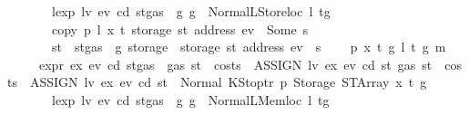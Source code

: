 \begin{isabellebody}
\ \ \ \ \ \ \ {\isachardoublequoteopen}lexp\ lv\ ev\ cd\ {\isacharparenleft}{\kern0pt}st{\isasymlparr}gas\ {\isacharcolon}{\kern0pt}{\isacharequal}{\kern0pt}\ g{\isasymrparr}{\isacharparenright}{\kern0pt}\ g\ {\isacharequal}{\kern0pt}\ Normal{\isacharparenleft}{\kern0pt}{\isacharparenleft}{\kern0pt}LStoreloc\ l{\isacharcomma}{\kern0pt}\ t{\isacharprime}{\kern0pt}{\isacharparenright}{\kern0pt}{\isacharcomma}{\kern0pt}g{\isacharprime}{\kern0pt}{\isacharparenright}{\kern0pt}{\isachardoublequoteclose}\isanewline
\ \ \ \ \ \ \ {\isachardoublequoteopen}copy\ p\ l\ x\ t\ {\isacharparenleft}{\kern0pt}storage\ st\ {\isacharparenleft}{\kern0pt}address\ ev{\isacharparenright}{\kern0pt}{\isacharparenright}{\kern0pt}\ {\isacharequal}{\kern0pt}\ Some\ s{\isachardoublequoteclose}\isanewline
\ \ \ \ \ \ \ {\isachardoublequoteopen}st{\isacharprime}{\kern0pt}\ {\isacharequal}{\kern0pt}\ st{\isasymlparr}gas\ {\isacharcolon}{\kern0pt}{\isacharequal}{\kern0pt}\ g{\isacharprime}{\kern0pt}{\isacharcomma}{\kern0pt}\ storage\ {\isacharcolon}{\kern0pt}{\isacharequal}{\kern0pt}\ {\isacharparenleft}{\kern0pt}storage\ st{\isacharparenright}{\kern0pt}\ {\isacharparenleft}{\kern0pt}address\ ev\ {\isacharcolon}{\kern0pt}{\isacharequal}{\kern0pt}\ s{\isacharparenright}{\kern0pt}{\isasymrparr}{\isachardoublequoteclose}\isanewline
\ \ {\isacharbar}{\kern0pt}\ {\isacharparenleft}{\kern0pt}{}{}{\isacharparenright}{\kern0pt}\ p\ x\ t\ g\ l\ t{\isacharprime}{\kern0pt}\ g{\isacharprime}{\kern0pt}\ m\isanewline
\ \ \ \ \ {\isachardoublequoteopen}expr\ ex\ ev\ cd\ {\isacharparenleft}{\kern0pt}st{\isasymlparr}gas\ {\isacharcolon}{\kern0pt}{\isacharequal}{\kern0pt}\ gas\ st\ {\isacharminus}{\kern0pt}\ costs\ \ {\isacharparenleft}{\kern0pt}ASSIGN\ lv\ ex{\isacharparenright}{\kern0pt}\ ev\ cd\ st{\isasymrparr}{\isacharparenright}{\kern0pt}\ {\isacharparenleft}{\kern0pt}gas\ st\ {\isacharminus}{\kern0pt}\ costs\ \ {\isacharparenleft}{\kern0pt}ASSIGN\ lv\ ex{\isacharparenright}{\kern0pt}\ ev\ cd\ st{\isacharparenright}{\kern0pt}\ {\isacharequal}{\kern0pt}\ Normal\ {\isacharparenleft}{\kern0pt}{\isacharparenleft}{\kern0pt}KStoptr\ p{\isacharcomma}{\kern0pt}\ Storage\ {\isacharparenleft}{\kern0pt}STArray\ x\ t{\isacharparenright}{\kern0pt}{\isacharparenright}{\kern0pt}{\isacharcomma}{\kern0pt}\ g{\isacharparenright}{\kern0pt}{\isachardoublequoteclose}\isanewline
\ \ \ \ \ \ \ {\isachardoublequoteopen}lexp\ lv\ ev\ cd\ {\isacharparenleft}{\kern0pt}st{\isasymlparr}gas\ {\isacharcolon}{\kern0pt}{\isacharequal}{\kern0pt}\ g{\isasymrparr}{\isacharparenright}{\kern0pt}\ g\ {\isacharequal}{\kern0pt}\ Normal{\isacharparenleft}{\kern0pt}{\isacharparenleft}{\kern0pt}LMemloc\ l{\isacharcomma}{\kern0pt}\ t{\isacharprime}{\kern0pt}{\isacharparenright}{\kern0pt}{\isacharcomma}{\kern0pt}g{\isacharprime}{\kern0pt}{\isacharparenright}{\kern0pt}{\isachardoublequoteclose}\isanewline

\end{isabellebody}
